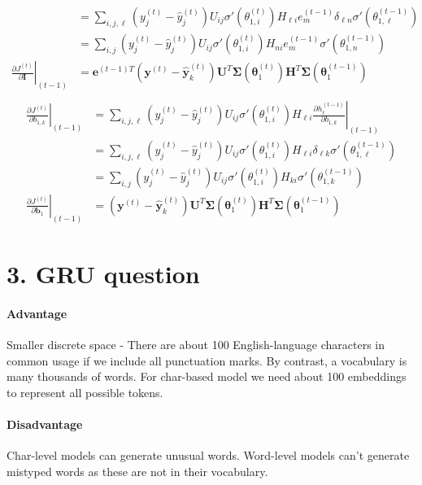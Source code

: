 \documentclass{article}
\begin{document}
\begin{itemize}
\begin{align*}
        &= \sum_{i,j,\ell} (y^{(t)}_j - \hat{y}^{(t)}_j) U_{ij} \sigma'(\theta_{1, i}^{(t)}) H_{\ell i} e^{(t-1)}_m \delta_{\ell n} \sigma'(\theta^{(t-1)}_{1, \ell}) \\
        &= \sum_{i,j} (y^{(t)}_j - \hat{y}^{(t)}_j) U_{ij} \sigma'(\theta_{1, i}^{(t)}) H_{n i} e^{(t-1)}_m \sigma'(\theta^{(t-1)}_{1, n}) \\
        \left. \frac{\partial J^{(t)}}{\partial \mathbf{I}} \right|_{(t-1)} &= \mathbf{e}^{(t-1) T} (\mathbf{y}^{(t)}-\hat{\mathbf{y}}^{(t)}_k) \mathbf{U}^T \boldsymbol{\Sigma}(\boldsymbol{\theta}_1^{(t)}) \mathbf{H}^T \boldsymbol{\Sigma}(\boldsymbol{\theta}_1^{(t-1)}) \\
    \end{align*}
    \begin{align*}
        \left. \frac{\partial J^{(t)}}{\partial b_{1,k}} \right|_{(t-1)} &= \sum_{i,j,\ell} (y^{(t)}_j - \hat{y}^{(t)}_j) U_{ij} \sigma'(\theta_{1, i}^{(t)}) H_{\ell i} \left.\frac{\partial h^{(t-1)}_\ell}{\partial b_{1,k}}\right|_{(t-1)} \\
        &= \sum_{i,j,\ell} (y^{(t)}_j - \hat{y}^{(t)}_j) U_{ij} \sigma'(\theta_{1, i}^{(t)}) H_{\ell i} \delta_{\ell k}\sigma'(\theta_{1, \ell}^{(t-1)}) \\
        &= \sum_{i,j} (y^{(t)}_j - \hat{y}^{(t)}_j) U_{ij} \sigma'(\theta_{1, i}^{(t)}) H_{k i} \sigma'(\theta_{1, k}^{(t-1)}) \\
        \left. \frac{\partial J^{(t)}}{\partial \mathbf{b}_1} \right|_{(t-1)} &= (\mathbf{y}^{(t)}-\hat{\mathbf{y}}^{(t)}_k) \mathbf{U}^T \boldsymbol{\Sigma}(\boldsymbol{\theta}_1^{(t)}) \mathbf{H}^T \boldsymbol{\Sigma}(\boldsymbol{\theta}_1^{(t-1)})
    \end{align*}
\end{itemize}

\section*{3. GRU question}
\paragraph{Advantage}
Smaller discrete space - There are about 100 English-language characters in common usage if we include all punctuation marks. By contrast, a vocabulary is many thousands of words. For char-based model we need about 100 embeddings to represent all possible tokens.

\paragraph{Disadvantage}
Char-level models can generate unusual words. Word-level models can't generate mistyped words as these are not in their vocabulary. 
\end{document}
